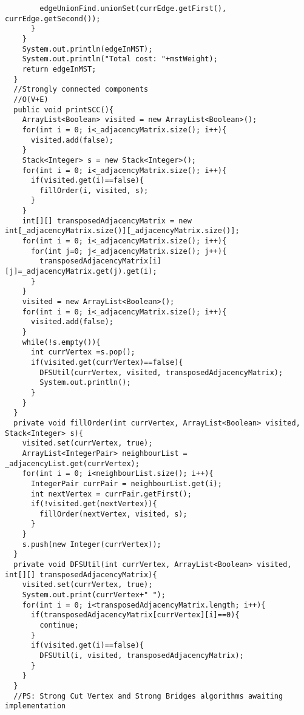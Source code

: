 \documentclass[11pt]{article}
\theoremstyle{definition}
\begin{document}
\begin{verbatim}
        edgeUnionFind.unionSet(currEdge.getFirst(), currEdge.getSecond());
      }
    }
    System.out.println(edgeInMST);
    System.out.println("Total cost: "+mstWeight);
    return edgeInMST;
  }
  //Strongly connected components
  //O(V+E)
  public void printSCC(){
    ArrayList<Boolean> visited = new ArrayList<Boolean>();
    for(int i = 0; i<_adjacencyMatrix.size(); i++){
      visited.add(false);
    } 
    Stack<Integer> s = new Stack<Integer>();
    for(int i = 0; i<_adjacencyMatrix.size(); i++){
      if(visited.get(i)==false){
        fillOrder(i, visited, s);
      }
    }
    int[][] transposedAdjacencyMatrix = new int[_adjacencyMatrix.size()][_adjacencyMatrix.size()];
    for(int i = 0; i<_adjacencyMatrix.size(); i++){
      for(int j=0; j<_adjacencyMatrix.size(); j++){
        transposedAdjacencyMatrix[i][j]=_adjacencyMatrix.get(j).get(i);
      }
    }
    visited = new ArrayList<Boolean>();
    for(int i = 0; i<_adjacencyMatrix.size(); i++){
      visited.add(false);
    }
    while(!s.empty()){
      int currVertex =s.pop();
      if(visited.get(currVertex)==false){
        DFSUtil(currVertex, visited, transposedAdjacencyMatrix);
        System.out.println();
      }
    }
  }
  private void fillOrder(int currVertex, ArrayList<Boolean> visited, Stack<Integer> s){
    visited.set(currVertex, true);
    ArrayList<IntegerPair> neighbourList = _adjacencyList.get(currVertex);
    for(int i = 0; i<neighbourList.size(); i++){
      IntegerPair currPair = neighbourList.get(i);
      int nextVertex = currPair.getFirst();
      if(!visited.get(nextVertex)){
        fillOrder(nextVertex, visited, s);
      }
    }
    s.push(new Integer(currVertex));
  }
  private void DFSUtil(int currVertex, ArrayList<Boolean> visited, int[][] transposedAdjacencyMatrix){
    visited.set(currVertex, true);
    System.out.print(currVertex+" ");
    for(int i = 0; i<transposedAdjacencyMatrix.length; i++){
      if(transposedAdjacencyMatrix[currVertex][i]==0){
        continue;
      }
      if(visited.get(i)==false){
        DFSUtil(i, visited, transposedAdjacencyMatrix);
      }
    }
  }
  //PS: Strong Cut Vertex and Strong Bridges algorithms awaiting implementation


\end{verbatim}
\end{document}
